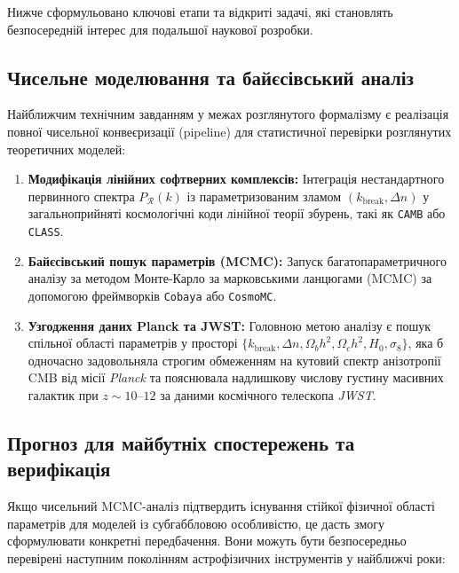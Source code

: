 \documentclass[12pt, a4paper]{article}
\begin{document}
Нижче сформульовано ключові етапи та відкриті задачі, які становлять безпосередній інтерес для подальшої наукової розробки.

\subsection{Чисельне моделювання та байєсівський аналіз}

Найближчим технічним завданням у межах розглянутого формалізму є реалізація повної чисельної конвеєризації (pipeline) для статистичної перевірки розглянутих теоретичних моделей:
\begin{enumerate}
  \item \textbf{Модифікація лінійних софтверних комплексів:} Інтеграція нестандартного первинного спектра $P_{\mathcal{R}}(k)$ із параметризованим зламом $(k_\mathrm{break}, \Delta n)$ у загальноприйняті космологічні коди лінійної теорії збурень, такі як \texttt{CAMB} або \texttt{CLASS}.
  \item \textbf{Байєсівський пошук параметрів (MCMC):} Запуск багатопараметричного аналізу за методом Монте-Карло за марковськими ланцюгами (MCMC) за допомогою фреймворків \texttt{Cobaya} або \texttt{CosmoMC}.
  \item \textbf{Узгодження даних Planck та JWST:} Головною метою аналізу є пошук спільної області параметрів у просторі $\{k_\mathrm{break}, \Delta n, \Omega_b h^2, \Omega_c h^2, H_0, \sigma_8\}$, яка б одночасно задовольняла строгим обмеженням на кутовий спектр анізотропії CMB від місії \emph{Planck} та пояснювала надлишкову числову густину масивних галактик при $z \sim 10$--$12$ за даними космічного телескопа \emph{JWST}.
\end{enumerate}

\subsection{Прогноз для майбутніх спостережень та верифікація}

Якщо чисельний MCMC-аналіз підтвердить існування стійкої фізичної області параметрів для моделей із субгаббловою особливістю, це дасть змогу сформулювати конкретні передбачення. Вони можуть бути безпосередньо перевірені наступним поколінням астрофізичних інструментів у найближчі роки:
\end{document}
